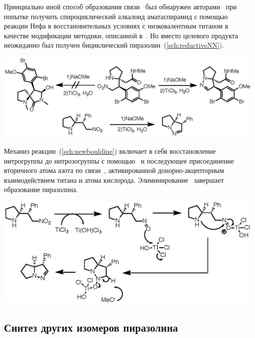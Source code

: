 Принциально иной способ образования связи~ был обнаружен авторами~\cite{Pangerl2010} при попытке получить спироциклический алкалоид аматаспирамид с помощью реакции Нефа в восстановительных условиях с низковалентным титаном в качестве модификации методики, описанной в~\cite{Hughes2002a}.
Но вместо целевого продукта неожиданно был получен бициклический пиразолин~(\ref{sch:reductiveNN}).

\begin{scheme}[h!]
    \centering
    \includegraphics{sections/literature/img/reductiveNN.eps}
    \caption{}
    \label{sch:reductiveNN}
\end{scheme}

Механиз реакции~(\ref{sch:newbouldine}) включает в себя восстановление нитрогруппы до нитрозогруппы с помощью~ и последующее присоединение вторичного атома азота по связи~, активированной донорно-акцепторным взаимодействием титана и атома кислорода. Элиминирование~ завершает образование пиразолина.

\begin{scheme}[h!]
    \centering
    \includegraphics{sections/literature/img/newbouldine.eps}
    \caption{}
    \label{sch:newbouldine}
\end{scheme}

\FloatBarrier{}

\subsection{Синтез других изомеров пиразолина}

